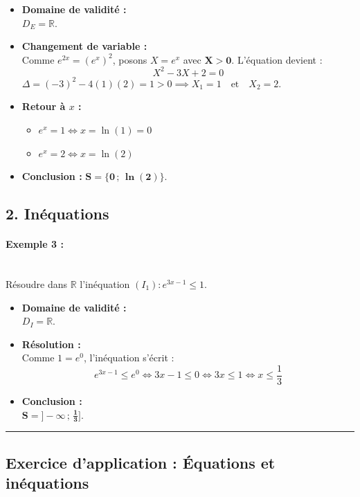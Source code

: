 \documentclass[12pt,a4paper]{article}
\begin{document}
\begin{itemize}
    \item \textbf{Domaine de validité :}\\ $D_E = \mathbb{R}$.
    \item \textbf{Changement de variable :}\\ Comme $e^{2x} = (e^x)^2$, posons $X = e^x$ avec $\mathbf{X > 0}$. L'équation devient :
    \[
    X^2 - 3X + 2 = 0
    \]
    $\Delta = (-3)^2 - 4(1)(2) = 1 > 0 \implies X_1 = 1 \quad \text{et} \quad X_2 = 2$.
    \item \textbf{Retour à $x$ :}
    \begin{itemize}
        \item $e^x = 1 \iff x = \ln(1) = 0$
        \item $e^x = 2 \iff x = \ln(2)$
    \end{itemize}
    \item \textbf{Conclusion :} $\mathbf{S = \{0 \,;\, \ln(2)\}}$.
\end{itemize}

\subsection*{\color{myred}2. Inéquations}

\paragraph{Exemple 3 :}\mbox{}\\[2mm]
Résoudre dans $\mathbb{R}$ l'inéquation $(I_1) : e^{3x - 1} \le 1$.

\begin{itemize}
    \item \textbf{Domaine de validité :}\mbox{}\\[2mm] $D_I = \mathbb{R}$.
    \item \textbf{Résolution :}\mbox{}\\[2mm]
    Comme $1 = e^0$, l'inéquation s'écrit :
    \[
    e^{3x - 1} \le e^0 \iff 3x - 1 \le 0 \iff 3x \le 1 \iff x \le \frac{1}{3}
    \]
    \item \textbf{Conclusion :}\mbox{}\\[2mm] $\mathbf{S = \Big]-\infty \,;\, \frac{1}{3}\Big]}$.
\end{itemize}

\vspace{0.3cm}
\hrule
\vspace{0.3cm}

\subsection*{\color{myred}Exercice d'application : Équations et inéquations}
\end{document}
